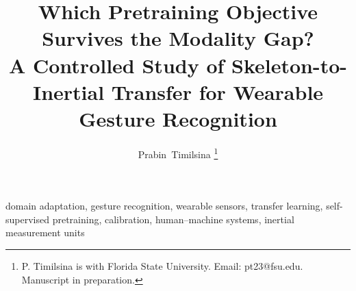 \documentclass[journal]{IEEEtran}
\begin{document}
\title{Which Pretraining Objective Survives the Modality Gap?\\
       A Controlled Study of Skeleton-to-Inertial Transfer for Wearable Gesture Recognition}

\author{Prabin~Timilsina%
  \thanks{P. Timilsina is with Florida State University. Email: pt23@fsu.edu. Manuscript in preparation.}}

\maketitle

\begin{abstract}

\end{abstract}

\begin{IEEEkeywords}
domain adaptation, gesture recognition, wearable sensors, transfer learning, self-supervised pretraining, calibration, human--machine systems, inertial measurement units
\end{IEEEkeywords}






\end{document}
